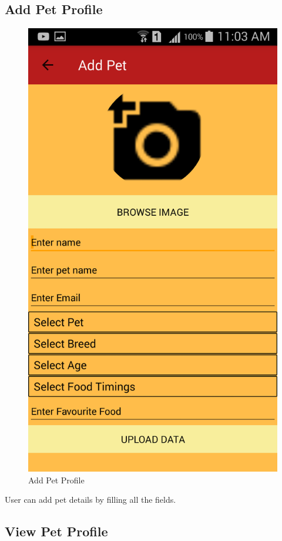 \subsection{Add Pet Profile}
\begin{figure}[H] 
  \centering
    \includegraphics[scale=0.3]{83addpetprofile}
     \caption{Add Pet Profile}
\end{figure}
User can add pet details by filling all the fields.


\newpage
\subsection{View Pet Profile}

